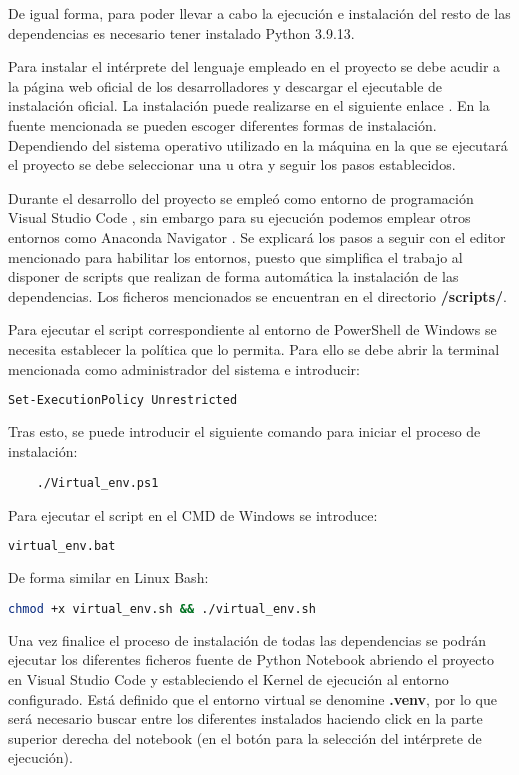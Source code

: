 De igual forma, para poder llevar a cabo la ejecución e instalación del resto de las dependencias es necesario tener instalado Python 3.9.13.

Para instalar el intérprete del lenguaje empleado en el proyecto se debe acudir a la página web oficial de los desarrolladores y descargar el ejecutable de instalación oficial.
La instalación puede realizarse en el siguiente enlace \cite{misc:python2023}.
En la fuente mencionada se pueden escoger diferentes formas de instalación. Dependiendo del sistema operativo utilizado en la máquina en la que se ejecutará el proyecto se debe seleccionar una
u otra y seguir los pasos establecidos.

Durante el desarrollo del proyecto se empleó como entorno de programación Visual Studio Code \cite{misc:code2023}, sin embargo para su ejecución podemos emplear otros entornos como 
Anaconda Navigator \cite{misc:conda2023}.
Se explicará los pasos a seguir con el editor mencionado para habilitar los entornos, puesto que simplifica el trabajo al disponer de scripts que realizan de forma automática 
la instalación de las dependencias.
Los ficheros mencionados se encuentran en el directorio \textbf{/scripts/}.

Para ejecutar el script correspondiente al entorno de PowerShell de Windows se necesita establecer la política que lo permita. Para ello se debe abrir la terminal mencionada
como administrador del sistema e introducir: 
\begin{lstlisting}[language=Bash]
    Set-ExecutionPolicy Unrestricted    
\end{lstlisting}

Tras esto, se puede introducir el siguiente comando para iniciar el proceso de instalación: 
\begin{lstlisting}
    ./Virtual_env.ps1
\end{lstlisting}

Para ejecutar el script en el CMD de Windows se introduce:
\begin{lstlisting}[language=Bash]
    virtual_env.bat
\end{lstlisting}

De forma similar en Linux Bash:
\begin{lstlisting}[language=Bash]
    chmod +x virtual_env.sh && ./virtual_env.sh    
\end{lstlisting}

Una vez finalice el proceso de instalación de todas las dependencias se podrán ejecutar los diferentes ficheros fuente de Python Notebook abriendo el proyecto en Visual Studio Code
y estableciendo el Kernel de ejecución al entorno configurado. Está definido que el entorno virtual se denomine \textbf{.venv}, por lo que será necesario buscar entre los diferentes 
instalados haciendo click en la parte superior derecha del notebook (en el botón para la selección del intérprete de ejecución).


